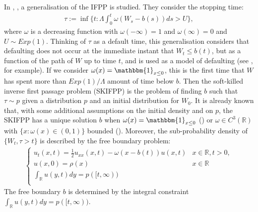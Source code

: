 \documentclass{article}
\newcommand{\B}[1]{\mathbb{#1}}
\newcommand{\is}{\mathbbm{1}}
\begin{document}
In \cite{ettingerHeningEvans}, \cite{ettingerHeningKwong}, a generalisation of the IFPP is studied. They consider the stopping time:
\begin{align}
    \tau:=\inf\Big\{t:\Lambda \int_0^t \omega(W_s-b(s))ds > U\Big\},
\end{align}
where $\omega$ is a decreasing function with $\omega(-\infty)=1$ and $\omega(\infty)=0$ and $U\sim Exp(1)$. Thinking of $\tau$ as a default time, this generalisation considers that defaulting does not occur at the immediate instant that $W_t\leq b(t)$, but as a function of the path of $W$ up to time $t$, and is used as a model of defaulting (see \cite{smoothDefault}, for example). If we consider $\omega(x)=\is_{x\leq 0}$, this is the first time that $W$ has spent more than $Exp(1)/\Lambda$ amount of time below $b$. Then the soft-killed inverse first passage problem (SKIFPP) is the problem of finding $b$ such that $\tau\sim p$ given a distribution $p$ and an initial distribution for $W_0$. It is already known that, with some additional assumptions on the initial density and on $p$, the SKIFPP has a unique solution $b$ when $\omega(x)=\is_{x\leq 0}$ (\cite{ettingerHeningKwong}) or $\omega\in C^3(\B{R})$ with $\{x:\omega(x)\in (0,1)\}$ bounded (\cite{ettingerHeningEvans}). Moreover, the sub-probability density of $\{W_t,\tau>t\}$ is described by the free boundary problem:
\begin{align*}\begin{cases}
    u_t(x,t)=\frac{1}{2}u_{xx}(x,t) - \omega(x-b(t))u(x,t) & x\in \B{R}, t>0, \\
    u(x,0)=\rho(x) & x\in \B{R}\\
    \int_\B{R} u(y,t)dy=p([t,\infty))\\
\end{cases}\end{align*}
The free boundary $b$ is determined by the integral constraint $\int_{\B{R}}u(y,t)dy=p([t,\infty))$.
\end{document}
